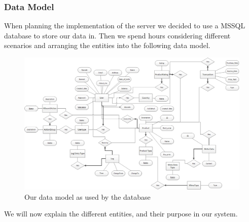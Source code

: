 \subsubsection{Data Model}
When planning the implementation of the server we decided to use a MSSQL database to store our data in. Then we spend hours considering different scenarios and arranging the entities into the following data model.
\begin{figure}[H]
  \includegraphics[width=\textwidth]{illustrations/Datamodel.png}
  \caption{Our data model as used by the database}
  \label{fig:datamodel}
\end{figure}
We will now explain the different entities, and their purpose in our system.

